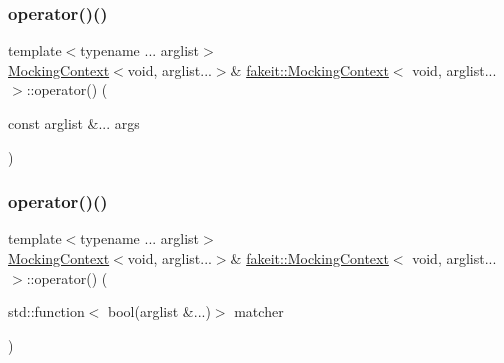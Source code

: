\subsubsection{\texorpdfstring{operator()()}{operator()()}\hspace{0.1cm}{\footnotesize\ttfamily [12/18]}}
{\footnotesize\ttfamily template$<$typename ... arglist$>$ \\
\mbox{\hyperlink{classfakeit_1_1MockingContext}{Mocking\+Context}}$<$void, arglist...$>$\& \mbox{\hyperlink{classfakeit_1_1MockingContext}{fakeit\+::\+Mocking\+Context}}$<$ void, arglist... $>$\+::operator() (\begin{DoxyParamCaption}\item[{const arglist \&...}]{args }\end{DoxyParamCaption})\hspace{0.3cm}{\ttfamily [inline]}}

\mbox{\label{classfakeit_1_1MockingContext_3_01void_00_01arglist_8_8_8_01_4_a1a5a55569a763877d395635979e6b3d6}} 
\subsubsection{\texorpdfstring{operator()()}{operator()()}\hspace{0.1cm}{\footnotesize\ttfamily [13/18]}}
{\footnotesize\ttfamily template$<$typename ... arglist$>$ \\
\mbox{\hyperlink{classfakeit_1_1MockingContext}{Mocking\+Context}}$<$void, arglist...$>$\& \mbox{\hyperlink{classfakeit_1_1MockingContext}{fakeit\+::\+Mocking\+Context}}$<$ void, arglist... $>$\+::operator() (\begin{DoxyParamCaption}\item[{std\+::function$<$ bool(arglist \&...)$>$}]{matcher }\end{DoxyParamCaption})\hspace{0.3cm}{\ttfamily [inline]}}

\mbox{\label{classfakeit_1_1MockingContext_3_01void_00_01arglist_8_8_8_01_4_a1a5a55569a763877d395635979e6b3d6}} 
